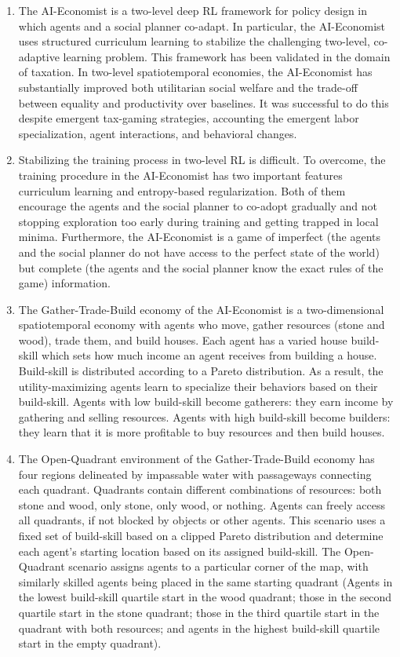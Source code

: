 \documentclass{article}
\begin{document}
\begin{enumerate}
\item The AI-Economist is a two-level deep RL framework for policy design in which agents and a social planner co-adapt. In particular, the AI-Economist uses structured curriculum learning to stabilize the challenging two-level, co-adaptive learning problem. This framework has been validated in the domain of taxation. In two-level spatiotemporal economies, the AI-Economist has substantially improved both utilitarian social welfare and the trade-off between equality and productivity over baselines. It was successful to do this despite emergent tax-gaming strategies, accounting the emergent labor specialization, agent interactions, and behavioral changes.

\item Stabilizing the training process in two-level RL is difficult. To overcome, the training procedure in the AI-Economist has two important features \textendash curriculum learning and entropy-based regularization. Both of them encourage the agents and the social planner to co-adopt gradually and not stopping exploration too early during training and getting trapped in local minima. Furthermore, the AI-Economist is a game of imperfect (the agents and the social planner do not have access to the perfect state of the world) but complete (the agents and the social planner know the exact rules of the game) information.

\item The Gather-Trade-Build economy of the AI-Economist is a two-dimensional spatiotemporal economy with agents who move, gather resources (stone and wood), trade them, and build houses. Each agent has a varied house build-skill which sets how much income an agent receives from building a house. Build-skill is distributed according to a Pareto distribution. As a result, the utility-maximizing agents learn to specialize their behaviors based on their build-skill. Agents with low build-skill become gatherers: they earn income by gathering and selling resources. Agents with high build-skill become builders: they learn that it is more profitable to buy resources and then build houses.

\item The Open-Quadrant environment of the Gather-Trade-Build economy has four regions delineated by impassable water with passageways connecting each quadrant. Quadrants contain different combinations of resources: both stone and wood, only stone, only wood, or nothing. Agents can freely access all quadrants, if not blocked by objects or other agents. This scenario uses a fixed set of build-skill based on a clipped Pareto distribution and determine each agent’s starting location based on its assigned build-skill. The Open-Quadrant scenario assigns agents to a particular corner of the map, with similarly skilled agents being placed in the same starting quadrant (Agents in the lowest build-skill quartile start in the wood quadrant; those in the second quartile start in the stone quadrant; those in the third quartile start in the quadrant with both resources; and agents in the highest build-skill quartile start in the empty quadrant).


\end{enumerate}
\end{document}
